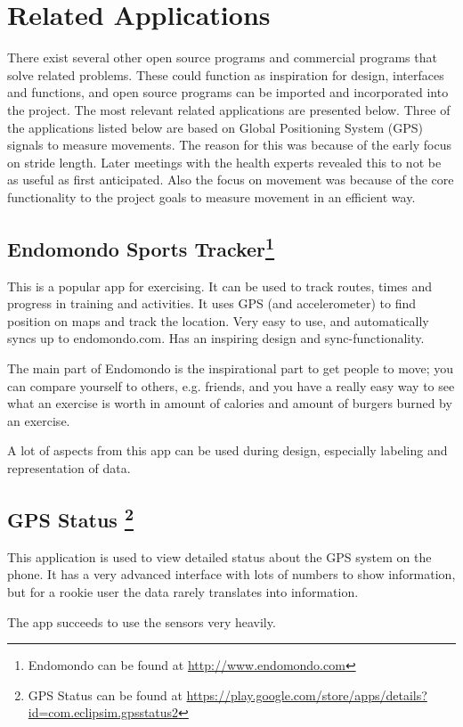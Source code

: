 \section{Related Applications}
There exist several other open source programs and commercial programs that solve related problems. These could function as inspiration for design, interfaces and functions, and open source programs can be imported and incorporated into the project. The most relevant related applications are presented below. Three of the applications listed below are based on Global Positioning System (GPS) signals to measure movements. The reason for this was because of the early focus on stride length. Later meetings with the health experts revealed this to not be as useful as first anticipated. Also the focus on movement was because of the core functionality to the project goals to measure movement in an efficient way.

\subsection{Endomondo Sports Tracker\footnote{Endomondo can be found at \url{http://www.endomondo.com}}}
This is a popular app for exercising. It can be used to track routes, times and progress in training and activities. It uses GPS (and accelerometer) to find position on maps and track the location. Very easy to use, and automatically syncs up to endomondo.com. Has an inspiring design and sync-functionality.

The main part of Endomondo is the inspirational part to get people to move; you can compare yourself to others, e.g. friends, and you have a really easy way to see what an exercise is worth in amount of calories and amount of burgers burned by an exercise.

A lot of aspects from this app can be used during design, especially labeling and representation of data.

\subsection{GPS Status \footnote{GPS Status can be found at \url{https://play.google.com/store/apps/details? id=com.eclipsim.gpsstatus2}}}
This application is used to view detailed status about the GPS system on the phone. It has a very advanced interface with lots of numbers to show information, but for a rookie user the data rarely translates into information.

The app succeeds to use the sensors very heavily.

